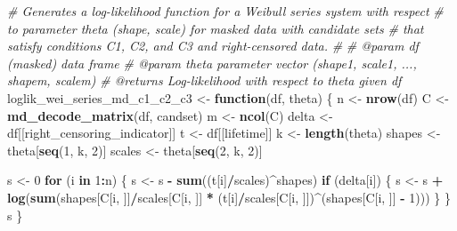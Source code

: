 \documentclass[
]{article}
\newenvironment{Shaded}{\begin{snugshade}}{\end{snugshade}}
\newcommand{\CommentTok}[1]{\textcolor[rgb]{0.56,0.35,0.01}{\textit{#1}}}
\newcommand{\ControlFlowTok}[1]{\textcolor[rgb]{0.13,0.29,0.53}{\textbf{#1}}}
\newcommand{\DecValTok}[1]{\textcolor[rgb]{0.00,0.00,0.81}{#1}}
\newcommand{\KeywordTok}[1]{\textcolor[rgb]{0.13,0.29,0.53}{\textbf{#1}}}
\newcommand{\NormalTok}[1]{#1}
\newcommand{\OperatorTok}[1]{\textcolor[rgb]{0.81,0.36,0.00}{\textbf{#1}}}
\newcommand{\StringTok}[1]{\textcolor[rgb]{0.31,0.60,0.02}{#1}}
\begin{document}
\begin{Shaded}
\begin{Highlighting}[]
\CommentTok{\#\textquotesingle{} Generates a log{-}likelihood function for a Weibull series system with respect}
\CommentTok{\#\textquotesingle{} to parameter \textasciigrave{}theta\textasciigrave{} (shape, scale) for masked data with candidate sets}
\CommentTok{\#\textquotesingle{} that satisfy conditions C1, C2, and C3 and right{-}censored data.}
\CommentTok{\#\textquotesingle{}}
\CommentTok{\#\textquotesingle{} @param df (masked) data frame}
\CommentTok{\#\textquotesingle{} @param theta parameter vector (shape1, scale1, ..., shapem, scalem)}
\CommentTok{\#\textquotesingle{} @returns Log{-}likelihood with respect to \textasciigrave{}theta\textasciigrave{} given \textasciigrave{}df\textasciigrave{}}
\NormalTok{loglik\_wei\_series\_md\_c1\_c2\_c3 \textless{}{-}}\StringTok{ }\ControlFlowTok{function}\NormalTok{(df, theta) \{}
\NormalTok{    n \textless{}{-}}\StringTok{ }\KeywordTok{nrow}\NormalTok{(df)}
\NormalTok{    C \textless{}{-}}\StringTok{ }\KeywordTok{md\_decode\_matrix}\NormalTok{(df, candset)}
\NormalTok{    m \textless{}{-}}\StringTok{ }\KeywordTok{ncol}\NormalTok{(C)}
\NormalTok{    delta \textless{}{-}}\StringTok{ }\NormalTok{df[[right\_censoring\_indicator]]}
\NormalTok{    t \textless{}{-}}\StringTok{ }\NormalTok{df[[lifetime]]}
\NormalTok{    k \textless{}{-}}\StringTok{ }\KeywordTok{length}\NormalTok{(theta)}
\NormalTok{    shapes \textless{}{-}}\StringTok{ }\NormalTok{theta[}\KeywordTok{seq}\NormalTok{(}\DecValTok{1}\NormalTok{, k, }\DecValTok{2}\NormalTok{)]}
\NormalTok{    scales \textless{}{-}}\StringTok{ }\NormalTok{theta[}\KeywordTok{seq}\NormalTok{(}\DecValTok{2}\NormalTok{, k, }\DecValTok{2}\NormalTok{)]}

\NormalTok{    s \textless{}{-}}\StringTok{ }\DecValTok{0}
    \ControlFlowTok{for}\NormalTok{ (i }\ControlFlowTok{in} \DecValTok{1}\OperatorTok{:}\NormalTok{n) \{}
\NormalTok{        s \textless{}{-}}\StringTok{ }\NormalTok{s }\OperatorTok{{-}}\StringTok{ }\KeywordTok{sum}\NormalTok{((t[i]}\OperatorTok{/}\NormalTok{scales)}\OperatorTok{\^{}}\NormalTok{shapes)}
        \ControlFlowTok{if}\NormalTok{ (delta[i]) \{}
\NormalTok{            s \textless{}{-}}\StringTok{ }\NormalTok{s }\OperatorTok{+}\StringTok{ }\KeywordTok{log}\NormalTok{(}\KeywordTok{sum}\NormalTok{(shapes[C[i, ]]}\OperatorTok{/}\NormalTok{scales[C[i, ]] }\OperatorTok{*}\StringTok{ }\NormalTok{(t[i]}\OperatorTok{/}\NormalTok{scales[C[i,}
\NormalTok{                ]])}\OperatorTok{\^{}}\NormalTok{(shapes[C[i, ]] }\OperatorTok{{-}}\StringTok{ }\DecValTok{1}\NormalTok{)))}
\NormalTok{        \}}
\NormalTok{    \}}
\NormalTok{    s}
\NormalTok{\}}
\end{Highlighting}
\end{Shaded}
\end{document}
